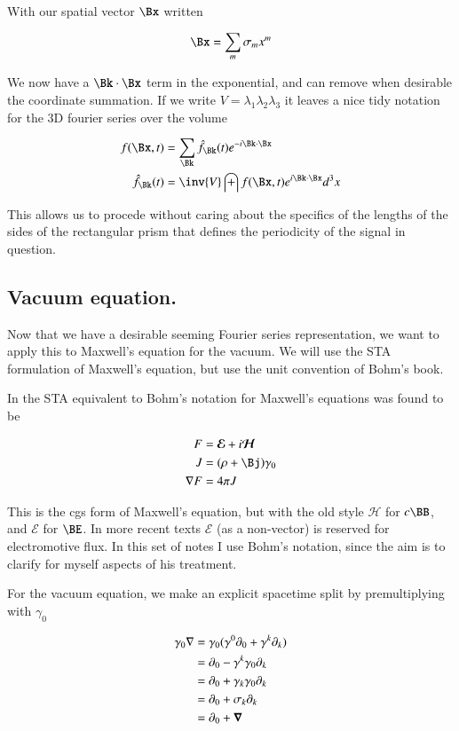 \documentclass{article}
\newcommand{\EE}[0]{\boldsymbol{\mathcal{E}}}
\newcommand{\HH}[0]{\boldsymbol{\mathcal{H}}}
\begin{document}
With our spatial vector $\Bx$ written

\begin{align*}
\Bx = \sum_m \sigma_m x^m
\end{align*}

We now have a $\Bk \cdot \Bx$ term in the exponential, and can remove when desirable the coordinate summation.  If we write $V = \lambda_1 \lambda_2 \lambda_3$
it leaves a nice tidy notation for the 3D fourier series over the volume

\begin{align}
f(\Bx, t) &= \sum_{\Bk} \hat{f}_{\Bk}(t) e^{ - i \Bk \cdot \Bx } \\
\hat{f}_{\Bk}( t) &= \inv{V} \int f(\Bx, t) e^{ i \Bk \cdot \Bx } d^3 x
\end{align}

This allows us to procede without caring about the specifics of the lengths of the sides of the rectangular prism that defines the periodicity of the signal
in question.

\subsection{ Vacuum equation. }

Now that we have a desirable seeming Fourier series representation, we 
want to apply this to Maxwell's equation for the vacuum.  We will use the 
STA formulation of Maxwell's equation, but use the unit convention of Bohm's
book.

In \cite{PJrayleighJeans} the STA equivalent to Bohm's notation 
for Maxwell's equations was found to be

\begin{align}\label{eqn:maxwell}
F &= \EE + i\HH \\
J &= (\rho + \Bj) \gamma_0 \\
\grad F &= 4 \pi J
\end{align}

This is the cgs form of Maxwell's equation, but with the old style $\HH$ for $c\BB$, and $\EE$ for $\BE$.  In more recent texts $\EE$ (as a non-vector) is reserved for electromotive flux.  In this set of notes I use Bohm's notation, since the aim is to clarify for myself aspects of his treatment.

For the vacuum equation, we make an explicit spacetime split by premultiplying with $\gamma_0$

\begin{align*}
\gamma_0 \nabla 
&= \gamma_0 (\gamma^0 \partial_0 + \gamma^k \partial_k) \\
&= \partial_0 - \gamma^k \gamma_0 \partial_k \\
&= \partial_0 + \gamma_k \gamma_0 \partial_k \\
&= \partial_0 + \sigma_k \partial_k \\
&= \partial_0 + \boldsymbol{\nabla} \\
\end{align*}
\end{document}
